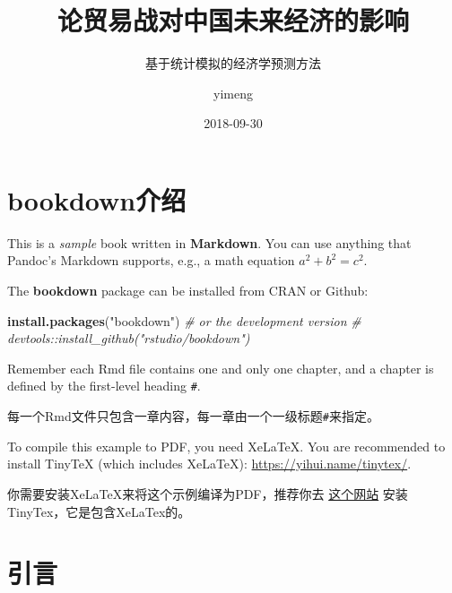 \documentclass[a4paper,bachelor]{ructhesis}
\title{论贸易战对中国未来经济的影响} %
\author{yimeng} %
\date{2018-09-30} %
\subtitle{基于统计模拟的经济学预测方法} %
\newenvironment{Shaded}{\begin{snugshade}}{\end{snugshade}}
\newcommand{\KeywordTok}[1]{\textcolor[rgb]{0.13,0.29,0.53}{\textbf{#1}}}
\newcommand{\StringTok}[1]{\textcolor[rgb]{0.31,0.60,0.02}{#1}}
\newcommand{\CommentTok}[1]{\textcolor[rgb]{0.56,0.35,0.01}{\textit{#1}}}
\newcommand{\NormalTok}[1]{#1}
\theoremstyle{definition}
\theoremstyle{definition}
\theoremstyle{definition}
\theoremstyle{remark}
\begin{document}
\maketitle





\frontmatter

\tableofcontents
\listoffigures
\listoftables


\mainmatter\clearpage
\pagestyle{fancy}

% 
% 
% 
\chapter{bookdown介绍}\label{bookdown}

This is a \emph{sample} book written in \textbf{Markdown}. You can use
anything that Pandoc's Markdown supports, e.g., a math equation
\(a^2 + b^2 = c^2\).

The \textbf{bookdown} package can be installed from CRAN or Github:

\begin{Shaded}
\begin{Highlighting}[]
\KeywordTok{install.packages}\NormalTok{(}\StringTok{"bookdown"}\NormalTok{)}
\CommentTok{# or the development version}
\CommentTok{# devtools::install_github("rstudio/bookdown")}
\end{Highlighting}
\end{Shaded}

Remember each Rmd file contains one and only one chapter, and a chapter
is defined by the first-level heading \texttt{\#}.

每一个Rmd文件只包含一章内容，每一章由一个一级标题\texttt{\#}来指定。

To compile this example to PDF, you need XeLaTeX. You are recommended to
install TinyTeX (which includes XeLaTeX):
\url{https://yihui.name/tinytex/}.

你需要安装XeLaTeX来将这个示例编译为PDF，推荐你去
\href{https://yihui.name/tinytex/}{这个网站}
安装TinyTex，它是包含XeLaTex的。

\chapter{引言}\label{intro}
\end{document}
